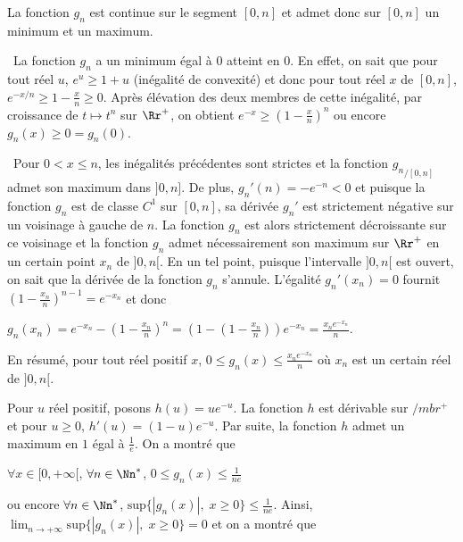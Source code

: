 {\begin{enumerate}
{La fonction $g_n$ est continue sur le segment $[0,n]$ et admet donc sur $[0,n]$ un minimum et un maximum.

\textbullet~La fonction $g_n$ a un minimum égal à $0$ atteint en $0$. En effet, on sait que pour tout réel $u$, $e^u\geqslant 1+u$ (inégalité de convexité) et donc pour tout réel $x$ de $[0,n]$,  $e^{-x/n}\geqslant 1-\frac{x}{n}\geqslant 0$. Après élévation des deux membres de cette inégalité, par croissance de $t\mapsto t^n$ sur $\Rr^+$, on obtient $e^{-x}\geqslant\left(1-\frac{x}{n}\right)^n$ ou encore $g_n(x)\geqslant 0 = g_n(0)$.

\textbullet~Pour $0 < x\leqslant n$, les inégalités précédentes sont strictes et la fonction ${g_n}_{/[0,n]}$ admet son maximum dans $]0,n]$. De plus, $g_n'(n)=-e^{-n}< 0$ et puisque la fonction $g_n$ est de classe $C^1$ sur $[0,n]$, sa dérivée $g_n'$ est strictement négative sur un voisinage à gauche de $n$. La fonction $g_n$ est alors strictement décroissante sur ce voisinage et la fonction $g_n$ admet nécessairement son maximum sur $\Rr^+$ en un certain point $x_n$ de $]0,n[$. En un tel point, puisque l'intervalle $]0,n[$ est ouvert, on sait que la dérivée de la fonction $g_n$ s'annule. L'égalité $g_n'(x_n) = 0$ fournit $\left(1-\frac{x_n}{n}\right)^{n-1}=e^{-x_n}$ et donc 

\begin{center}
$g_n(x_n) =e^{-x_n}-\left(1-\frac{x_n}{n}\right)^n =\left(1-\left(1-\frac{x_n}{n}\right)\right)e^{-x_n}=  \frac{x_ne^{-x_n}}{n}$.
\end{center}

En résumé, pour tout réel positif $x$, $0\leqslant g_n(x)\leqslant\frac{x_ne^{-x_n}}{n}$ où $x_n$ est un certain réel de $]0,n[$.

Pour $u$ réel positif, posons $h(u) = ue^{-u}$. La fonction $h$ est dérivable sur $/mbr^+$ et pour $u\geqslant0$, $h'(u) = (1-u)e^{-u}$. Par suite, la fonction $h$ admet un maximum en $1$ égal à $\frac{1}{e}$. On a montré que

\begin{center}
$\forall x\in[0,+\infty[$, $\forall n\in\Nn^*$, $0\leqslant g_n(x)\leqslant\frac{1}{ne}$
\end{center}

ou encore
$\forall n\in\Nn^*$, $\text{sup}\{|g_n(x)|,\;x\geqslant 0\}\leqslant\frac{1}{ne}$. Ainsi, $\lim_{n \rightarrow +\infty}\text{sup}\{|g_n(x)|,\;x\geqslant 0\}=0$ et on a montré que
 
 
\begin{center}
\end{center}

}
\end{enumerate}}
